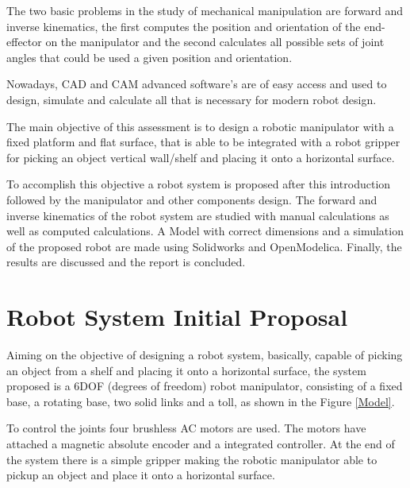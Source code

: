 \documentclass[transmag]{IEEEtran}
\begin{document}
The two basic problems in the study of mechanical manipulation are forward and inverse kinematics, the first computes the position and orientation of the end-effector on the manipulator and the second calculates all possible sets of joint angles that could be used  a given position and orientation. 

Nowadays, CAD and CAM advanced software's are of easy access and used to design, simulate and calculate all that is necessary for modern robot design.

The main objective of this assessment is to design a robotic manipulator with a fixed platform and flat surface, that is able to be integrated with a robot gripper for picking an object vertical wall/shelf and placing it onto a horizontal surface. 

To accomplish this objective a robot system is proposed after this introduction followed by the manipulator and other components design. The forward and inverse kinematics of the robot system are studied with manual calculations as well as computed calculations. A Model with correct dimensions and a simulation of the proposed robot are made using Solidworks and OpenModelica. Finally, the results are discussed and the report is concluded.






 

\section{Robot System Initial Proposal}

Aiming on the objective of designing a robot system, basically, capable of picking an object from a shelf and placing it onto a horizontal surface, the system proposed is a 6DOF (degrees of freedom) robot manipulator, consisting of a fixed base, a rotating base, two solid links and a toll, as shown in the Figure \ref{Model}.

To control the joints four brushless AC motors are used. The motors have attached a magnetic absolute encoder and a integrated controller.
At the end of the system there is a simple gripper making the robotic manipulator able to pickup an object and place it onto a horizontal surface.  
\end{document}
